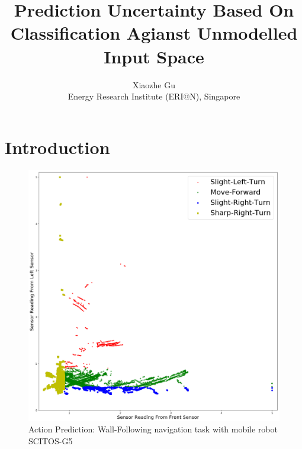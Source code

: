 \documentclass[11pt,onecolumn]{IEEEtran}
\begin{document}
     
\title{Prediction Uncertainty Based On Classification Agianst Unmodelled Input Space}
\author{Xiaozhe Gu\\Energy Research Institute (ERI@N), Singapore }

\maketitle

\section{Introduction}
\begin{figure}[h]
    \centering
    \caption{Action Prediction: Wall-Following navigation task with mobile robot SCITOS-G5}
    \includegraphics[scale=0.25]{image/robot2.png} 
\end{figure}
\end{document}
